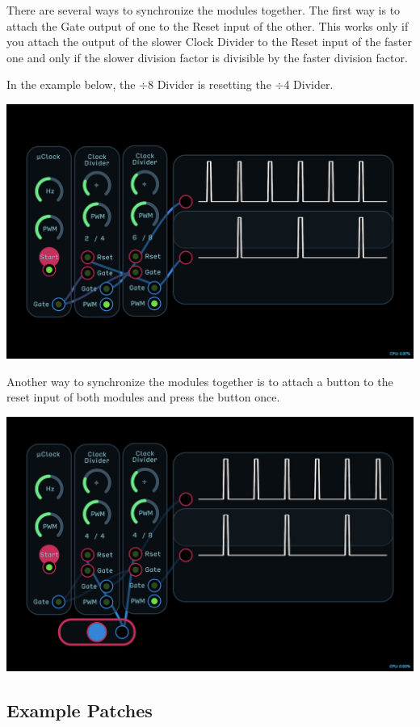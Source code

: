\documentclass[11pt]{book}
\begin{document}
\begin{multicols*}{2}
There are several ways to synchronize the modules together. The first way is to attach the Gate output of one to the Reset input of the other. This works only if you attach the output of the slower Clock Divider to the Reset input of the faster one and only if the slower division factor is divisible by the faster division factor.

In the example below, the $\div$8 Divider is resetting the $\div$4 Divider.

\begin{center}
\includegraphics[width=0.95\linewidth]{clock-divider-fig5.png}
\end{center}

Another way to synchronize the modules together is to attach a button to the reset input of both modules and press the button once.

\begin{center}
\includegraphics[width=0.95\linewidth]{clock-divider-fig6.png}
\end{center}

\subsection*{Example Patches}


\end{multicols*}
\end{document}
